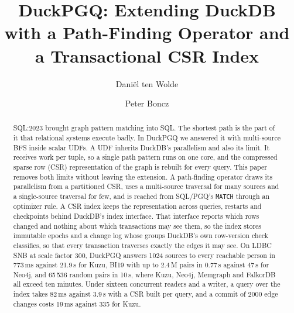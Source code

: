 \documentclass[sigconf, nonacm]{acmart}
\newcommand{\duckpgq}{DuckPGQ\xspace}
\newcommand{\duckdb}{DuckDB\xspace}
\newcommand{\sqlpgq}{SQL/PGQ\xspace}
\begin{document}
\title{DuckPGQ: Extending DuckDB with a Path-Finding Operator and a Transactional CSR Index}

\author{Dani\"el ten Wolde}

\author{Peter Boncz}

\begin{abstract}
SQL:2023 brought graph pattern matching into SQL. The shortest path is the part of it that relational systems
execute badly. In \duckpgq we answered it with multi-source BFS inside scalar UDFs. A UDF inherits \duckdb's
parallelism and also its limit. It receives work per tuple, so a single path pattern runs on one core, and the
compressed sparse row (CSR) representation of the graph is rebuilt for every query. This paper removes both limits
without leaving the extension. A path-finding operator draws its parallelism from a partitioned CSR, uses a
multi-source traversal for many sources and a single-source traversal for few, and is reached from \sqlpgq's
\texttt{MATCH} through an optimizer rule. A CSR index keeps the representation across queries, restarts and
checkpoints behind \duckdb's index interface. That interface reports which rows changed and nothing about which
transactions may see them, so the index stores immutable epochs and a change log whose groups \duckdb's own row-version check
classifies, so that every transaction traverses exactly the edges it may see. On LDBC SNB at scale
factor 300, \duckpgq answers 1024 sources to every reachable person in 773\,ms against 21.9\,s for Kuzu, BI19 with up
to 2.4\,M pairs in 0.77\,s against 47\,s for Neo4j, and 65\,536 random pairs in 10\,s, where Kuzu, Neo4j, Memgraph
and FalkorDB all exceed ten minutes. Under sixteen concurrent readers and a writer, a query over the index takes
82\,ms against 3.9\,s with a CSR built per query, and a commit of 2000 edge changes costs 19\,ms against 335 for Kuzu.
\end{abstract}

\maketitle
\end{document}
